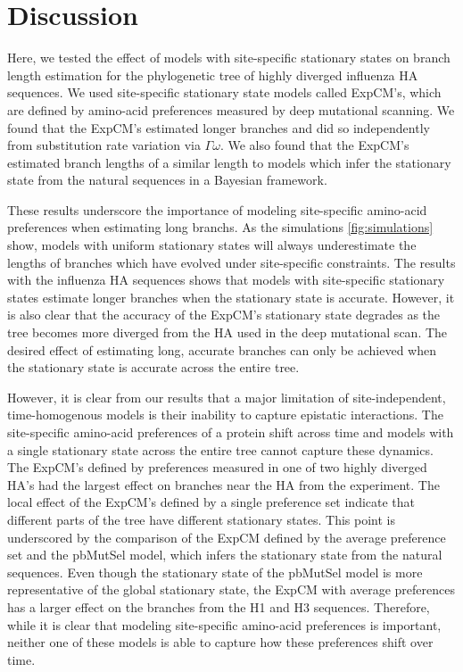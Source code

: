 \documentclass[11pt]{article}
\begin{document}
\section*{Discussion}

Here, we tested the effect of models with site-specific stationary states on branch length estimation for the phylogenetic tree of highly diverged influenza HA sequences. 
We used site-specific stationary state models called ExpCM's, which are defined by amino-acid preferences measured by deep mutational scanning. 
We found that the ExpCM's estimated longer branches and did so independently from substitution rate variation via $\Gamma\omega$. 
We also found that the ExpCM's estimated branch lengths of a similar length to models which infer the stationary state from the natural sequences in a Bayesian framework.  

These results underscore the importance of modeling site-specific amino-acid preferences when estimating long branchs. 
As the simulations \ref{fig:simulations} show, models with uniform stationary states will always underestimate the lengths of branches which have evolved under site-specific constraints. 
The results with the influenza HA sequences shows that models with site-specific stationary states estimate longer branches when the stationary state is accurate. 
However, it is also clear that the accuracy of the ExpCM's stationary state degrades as the tree becomes more diverged from the HA used in the deep mutational scan. 
The desired effect of estimating long, accurate branches can only be achieved when the stationary state is accurate across the entire tree. 

However, it is clear from our results that a major limitation of site-independent, time-homogenous models is their inability to capture epistatic interactions. 
The site-specific amino-acid preferences of a protein shift across time and models with a single stationary state across the entire tree cannot capture these dynamics. 
The ExpCM's defined by preferences measured in one of two highly diverged HA's had the largest effect on branches near the HA from the experiment. 
The local effect of the ExpCM's defined by a single preference set indicate that different parts of the tree have different stationary states. 
This point is underscored by the comparison of the ExpCM defined by the average preference set and the pbMutSel model, which infers the stationary state from the natural sequences. 
Even though the stationary state of the pbMutSel model is more representative of the global stationary state, the ExpCM with average preferences has a larger effect on the branches from the H1 and H3 sequences. 
Therefore, while it is clear that modeling site-specific amino-acid preferences is important, neither one of these models is able to capture how these preferences shift over time.
\end{document}
